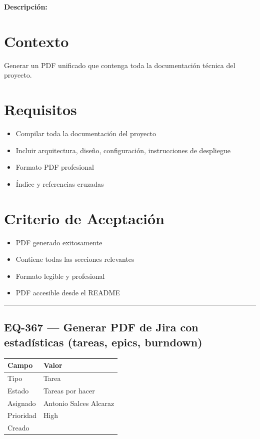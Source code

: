 \documentclass[
  spanish,
  11pt,
]{report}
\newcounter{none} %
\providecommand{\tightlist}{%
  \setlength{\itemsep}{0pt}\setlength{\parskip}{0pt}}
\begin{document}
\textbf{Descripción:}

\section{Contexto}\label{contexto-4}

Generar un PDF unificado que contenga toda la documentación técnica del
proyecto.

\section{Requisitos}\label{requisitos-3}

\begin{itemize}
\tightlist
\item
  Compilar toda la documentación del proyecto
\item
  Incluir arquitectura, diseño, configuración, instrucciones de
  despliegue
\item
  Formato PDF profesional
\item
  Índice y referencias cruzadas
\end{itemize}

\section{Criterio de Aceptación}\label{criterio-de-aceptaciuxf3n-3}

\begin{itemize}
\tightlist
\item[$\square$]
  PDF generado exitosamente
\item[$\square$]
  Contiene todas las secciones relevantes
\item[$\square$]
  Formato legible y profesional
\item[$\square$]
  PDF accesible desde el README
\end{itemize}

\begin{center}\rule{0.5\linewidth}{0.5pt}\end{center}

\subsection{EQ-367 --- Generar PDF de Jira con estadísticas (tareas,
epics,
burndown)}\label{eq-367-generar-pdf-de-jira-con-estaduxedsticas-tareas-epics-burndown}

{\def\LTcaptype{none} %
\begin{longtable}[]{@{}ll@{}}
\toprule\noalign{}
Campo & Valor \\
\midrule\noalign{}
\endhead
\bottomrule\noalign{}
\endlastfoot
Tipo & Tarea \\
Estado & Tareas por hacer \\
Asignado & Antonio Salces Alcaraz \\
Prioridad & High \\
Creado & \\
\end{longtable}
}
\end{document}
